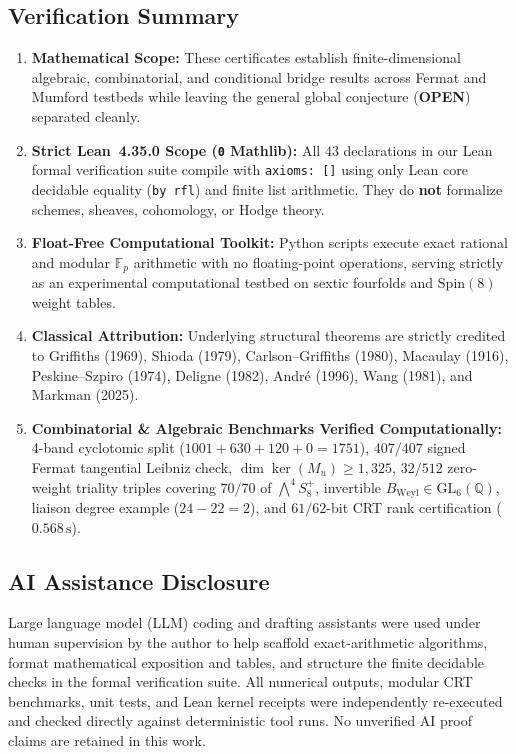 \documentclass[11pt,a4paper]{article}
\theoremstyle{definition}
\theoremstyle{remark}
\begin{document}
\subsection{Verification Summary}
\begin{enumerate}[label=\textbf{\arabic*.}]
\item \textbf{Mathematical Scope:} These certificates establish finite-dimensional algebraic, combinatorial, and conditional bridge results across Fermat and Mumford testbeds while leaving the general global conjecture (\textbf{OPEN}) separated cleanly.
\item \textbf{Strict Lean~4.35.0 Scope (\texttt{0} Mathlib):} All $43$ declarations in our Lean formal verification suite compile with \texttt{axioms: []} using only Lean core decidable equality (\texttt{by rfl}) and finite list arithmetic. They do \textbf{not} formalize schemes, sheaves, cohomology, or Hodge theory.
\item \textbf{Float-Free Computational Toolkit:} Python scripts execute exact rational and modular $\mathbb{F}_p$ arithmetic with no floating-point operations, serving strictly as an experimental computational testbed on sextic fourfolds and $\mathrm{Spin}(8)$ weight tables.
\item \textbf{Classical Attribution:} Underlying structural theorems are strictly credited to Griffiths (1969), Shioda (1979), Carlson--Griffiths (1980), Macaulay (1916), Peskine--Szpiro (1974), Deligne (1982), Andr\'e (1996), Wang (1981), and Markman (2025).
\item \textbf{Combinatorial \& Algebraic Benchmarks Verified Computationally:} 4-band cyclotomic split ($1001+630+120+0=1751$), $407/407$ signed Fermat tangential Leibniz check, $\dim \ker(M_u) \ge 1,325$, $32/512$ zero-weight triality triples covering $70/70$ of $\bigwedge^4 S^+_8$, invertible $B_{\mathrm{Weyl}} \in \mathrm{GL}_6(\mathbb{Q})$, liaison degree example ($24-22=2$), and $61/62$-bit CRT rank certification ($0.568\,\mathrm{s}$).
\end{enumerate}

\subsection{AI Assistance Disclosure}
\label{sec:ai_disclosure}
Large language model (LLM) coding and drafting assistants were used under human supervision by the author to help scaffold exact-arithmetic algorithms, format mathematical exposition and tables, and structure the finite decidable checks in the formal verification suite. All numerical outputs, modular CRT benchmarks, unit tests, and Lean kernel receipts were independently re-executed and checked directly against deterministic tool runs. No unverified AI proof claims are retained in this work.
\end{document}
